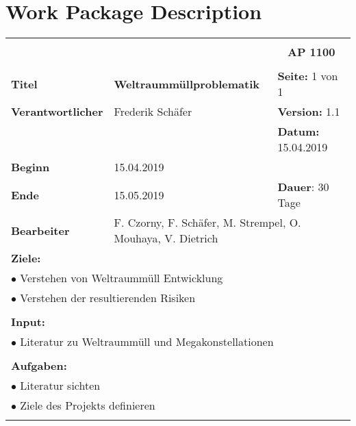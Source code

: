 \section{Work Package Description}
\label{sec:wpd}


\begin{table}[!h]
 \begin{center}
  \begin{tabular}{|p{35mm}||p{55mm}|p{50mm}||p{40mm}|}
   \hline
   \multicolumn{3}{|l||}{\textbf{}} & \multicolumn{1}{c|}{}\\
   \multicolumn{3}{|l||}{\textbf{}} & \multicolumn{1}{c|}{\textbf{AP 1100}}\\
   \multicolumn{3}{|l||}{\textbf{}} & \multicolumn{1}{c|}{}\\
   \hline\hline
   \textbf{Titel} & \multicolumn{2}{p{7cm}||}{\textbf{Weltraummüllproblematik}} & \textbf{Seite:} 1 von 1\\
   \hline
   \textbf{Verantwortlicher} & \multicolumn{2}{l||}{Frederik Schäfer} & \textbf{Version:} 1.1\\
   \hline
   \multicolumn{3}{|l||}{} & \textbf{Datum:} 15.04.2019\\
   \hline\hline
   \textbf{Beginn} & \multicolumn{2}{l||}{15.04.2019} & \\
   \hline
   \textbf{Ende} & \multicolumn{2}{l||}{15.05.2019} & \textbf{Dauer}: 30 Tage\\
   \hline\hline
   \textbf{Bearbeiter} & \multicolumn{3}{l|}{F. Czorny, F. Schäfer, M. Strempel, O. Mouhaya, V. Dietrich}\\
   \hline\hline
   \multicolumn{4}{|p{150mm}|}{\textbf{Ziele:}}\\
   \multicolumn{4}{|p{150mm}|}{$\bullet$ Verstehen von Weltraummüll Entwicklung}\\
   \multicolumn{4}{|p{150mm}|}{$\bullet$ Verstehen der resultierenden Risiken}\\
   \multicolumn{4}{|p{150mm}|}{}\\
   \multicolumn{4}{|p{150mm}|}{\textbf{Input:}}\\
   \multicolumn{4}{|p{150mm}|}{$\bullet$ Literatur zu Weltraummüll und Megakonstellationen}\\
   \multicolumn{4}{|p{150mm}|}{}\\
   \multicolumn{4}{|p{150mm}|}{\textbf{Aufgaben:}}\\
   \multicolumn{4}{|p{150mm}|}{$\bullet$ Literatur sichten}\\
   \multicolumn{4}{|p{150mm}|}{$\bullet$ Ziele des Projekts definieren}\\
   \multicolumn{4}{|p{150mm}|}{}\\
   \hline
  \end{tabular}
 \end{center}
\end{table}

